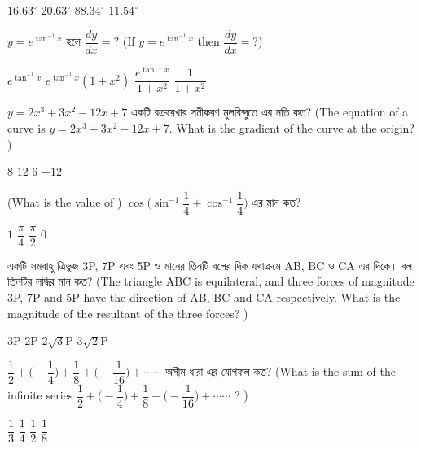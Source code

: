 \documentclass[addpoints]{exam}
\begin{document}
\begin{questions}
\begin{oneparchoices}
\choice $ 16.63^{\circ} $
\choice $ 20.63^{\circ} $
\choice $ 88.34^{\circ} $
\choice $ 11.54^{\circ} $
\end{oneparchoices}

\question $ y=e^{\tan^{-1}x} $ হলে $ \dfrac{dy}{dx}=?  $ (If $ y=e^{\tan^{-1}x} $ then $ \dfrac{dy}{dx}=?  $) 

\begin{oneparchoices}
\choice $ e^{\tan^{-1}x} $
\choice $ e^{\tan^{-1}x}(1+x^{2}) $
\choice $ \dfrac{e^{\tan^{-1}x}}{1+x^{2}} $
\choice $ \dfrac{1}{1+x^{2}} $
\end{oneparchoices}



\question $ y=2x^{3}+3x^{2}-12x+7 $ একটি বক্ররেখার সমীকরণ মুলবিন্দুতে এর নতি কত? (The equation of a curve is $ y=2x^{3}+3x^{2}-12x+7 $. What is the gradient of the curve at the origin? )

\begin{oneparchoices}
\choice $ 8 $
\choice $ 12 $
\choice $ 6 $
\choice $ -12 $
\end{oneparchoices}

\question  (What is the value of ) $ \cos\Bigg(\sin^{-1}\dfrac{1}{4} + \cos^{-1}\dfrac{1}{4}\Bigg) $ এর মান কত?

\begin{oneparchoices}
\choice $ 1 $
\choice $ \dfrac{\pi}{4} $
\choice $ \dfrac{\pi}{2} $
\choice $ 0 $
\end{oneparchoices}

\question একটি সমবাহু ত্রিভুজ 3P, 7P এবং 5P ও মানের তিনটি বলের দিক যথাক্রমে AB, BC ও CA এর দিকে। বল তিনটির লদ্ধির মান কত? (The triangle ABC is equilateral, and three forces of magnitude 3P, 7P and 5P have the direction of AB, BC and CA respectively. What is the magnitude of the resultant of the three forces? )

\begin{oneparchoices}
\choice $ 3 $P
\choice $ 2 $P
\choice $ 2\sqrt{3} $P
\choice  $ 3\sqrt{2} $P
\end{oneparchoices}

\question $ \dfrac{1}{2}+\Big(-\dfrac{1}{4} \Big)+\dfrac{1}{8}+\Big(-\dfrac{1}{16} \Big) + \cdots \cdots $ অসীম ধারা এর যোগফল কত? (What is the sum of the infinite series $ \dfrac{1}{2}+\Big(-\dfrac{1}{4} \Big)+\dfrac{1}{8}+\Big(-\dfrac{1}{16} \Big) + \cdots \cdots $ ? )


\begin{oneparchoices}
\choice $ \dfrac{1}{3} $
\choice $ \dfrac{1}{4} $
\choice $ \dfrac{1}{2} $
\choice $ \dfrac{1}{8} $
\end{oneparchoices}



\end{questions}
\end{document}
